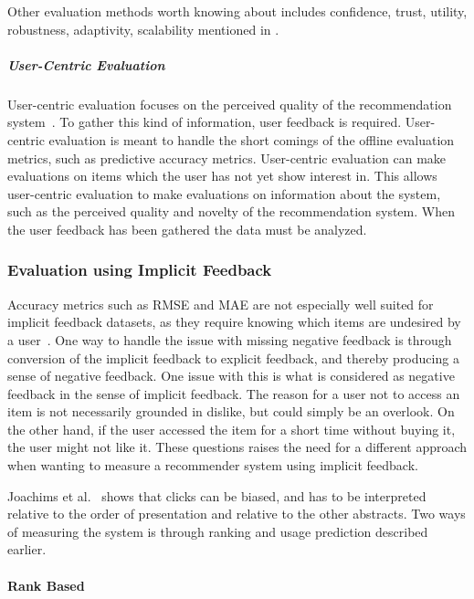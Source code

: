 Other evaluation methods worth knowing about includes confidence, trust,
utility, robustness, adaptivity, scalability mentioned in \cite{Herlocker2004,
Shani2011}.

\subparagraph{User-Centric Evaluation} User-centric evaluation focuses on the
perceived quality of the recommendation system~\cite{Pu2011}.  To gather this
kind of information, user feedback is required.  User-centric evaluation is
meant to handle the short comings of the offline evaluation metrics, such as
predictive accuracy metrics.  User-centric evaluation can make evaluations on
items which the user has not yet show interest in.  This allows user-centric
evaluation to make evaluations on information about the system, such as the
perceived quality and novelty of the recommendation system.  When the user
feedback has been gathered the data must be analyzed.


\subsubsection{Evaluation using Implicit Feedback}

Accuracy metrics such as RMSE and MAE are not especially well suited for
implicit feedback datasets, as they require knowing which items are undesired
by a user~\cite{Hu2008}.  One way to handle the issue with missing negative
feedback is through conversion of the implicit feedback to explicit feedback,
and thereby producing a sense of negative feedback.  One issue with this is
what is considered as negative feedback in the sense of implicit feedback.  The
reason for a user not to access an item is not necessarily grounded in dislike,
but could simply be an overlook.  On the other hand, if the user accessed the
item for a short time without buying it, the user might not like it.  These
questions raises the need for a different approach when wanting to measure a
recommender system using implicit feedback.

Joachims et al.~\cite{Joachims07evaluatingthe} shows that clicks can be biased,
and has to be interpreted relative to the order of presentation and relative to
the other abstracts.  Two ways of measuring the system is through ranking and
usage prediction described earlier.

\paragraph{Rank Based} %
\label{par:Ranking_based}

